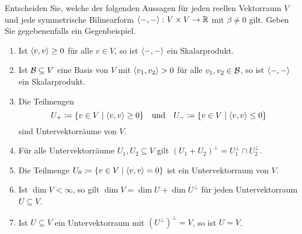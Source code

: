 \documentclass[a4paper, 10pt]{scrartcl}
\begin{document}
\begin{question}
  Entscheiden Sie, welche der folgenden Aussagen für jeden reellen Vektorraum $V$ und jede symmetrische Bilinearform $\left\langle -, - \right\rangle \colon V \times V \to \mathbb{R}$ mit $\beta \neq 0$ gilt.
  Geben Sie gegebenenfalls ein Gegenbeispiel.
  \begin{enumerate}[leftmargin=*]
    \item
      Ist $\left\langle v, v \right\rangle \geq 0$ für alle $v \in V$, so ist $\left\langle -, - \right\rangle$ ein Skalarprodukt.
    \item
      Ist $\mathcal{B} \subseteq V$ eine Basis von $V$ mit $\left\langle v_1, v_2 \right\rangle > 0$ für alle $v_1, v_2 \in \mathcal{B}$, so ist $\left\langle -, - \right\rangle$ ein Skalarprodukt.
    \item
      Die Teilmengen
      \[
        U_+ \coloneqq \{ v \in V \mid \left\langle v, v \right\rangle \geq 0 \}
        \quad\text{und}\quad
        U_- \coloneqq \{ v \in V \mid \left\langle v, v \right\rangle \leq 0 \}
      \]
      sind Untervektorräume von $V$.
    \item
      Für alle Untervektorräume $U_1, U_2 \subseteq V$ gilt $(U_1 + U_2)^\perp = U_1^\perp \cap U_2^\perp$.
    \item
      Die Teilmenge $U_0 \coloneqq \{ v \in V \mid \left\langle v, v \right\rangle = 0 \}$ ist ein Untervektorraum von $V$.
    \item
      Ist $\dim V < \infty$, so gilt $\dim V = \dim U + \dim U^\perp$ für jeden Untervektorraum $U \subseteq V$.
    \item
      Ist $U \subseteq V$ ein Untervektorraum mit $(U^\perp)^\perp = V$, so ist $U = V$.

  \end{enumerate}
\end{question}
\end{document}
